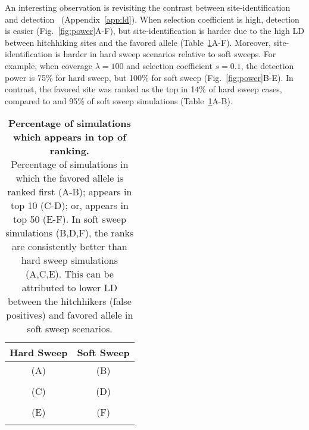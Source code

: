 An interesting observation is revisiting the contrast between 
site-identification
and detection~\cite{long2013massive,tobler2014massive} (Appendix~\ref{app:ld}). 
When selection 
coefficient is high, detection is easier
(Fig.~\ref{fig:power}A-F), but site-identification is harder due to
the high LD between hitchhiking sites and the favored allele
(Table~\ref{tab:rank}A-F).  Moreover, site-identification is harder in
hard sweep scenarios relative to soft sweeps. For example, when
coverage $\lambda=100$ and selection coefficient $s=0.1$, the
detection power is 75\% for hard sweep, but 100\% for soft sweep
(Fig.~\ref{fig:power}B-E). In contrast, the favored site was ranked as
the top in 14\% of hard sweep cases, compared to and 95\% of soft
sweep simulations (Table~\ref{tab:rank}A-B).  

\newcommand*\rot{\rotatebox{-90} }
\begin{table}[H]
	\centering
	\begin{tabular}{c||c}
		 Hard Sweep &Soft Sweep\\
		\hline
		(A) & (B)  \\
		{}
		 &{ }\\
		\hline
		(C)  & (D)  \\
		{}
		& { }\\
		\hline
		(E) & (F) \\
		{}
		&{ }\\
		\hline
	\end{tabular}\\
	\caption{{\bf Percentage of simulations which appears in top of ranking.}\\
		Percentage of simulations in which the favored allele is ranked 
	first 
		(A-B); 
		appears in top 10 (C-D); or,  appears in top 50 (E-F). In soft sweep 
		simulations (B,D,F), the ranks are consistently better than 
		hard sweep simulations (A,C,E). This can be attributed to lower LD 
		between the 
		hitchhikers (false positives) and favored allele in soft sweep 
		scenarios.}\label{tab:rank}
\end{table}
 

